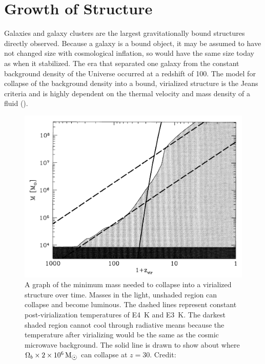 \documentclass{paper}
\begin{document}
\section*{Growth of Structure}
  Galaxies and galaxy clusters are the largest gravitationally bound 
  structures directly observed. Because a galaxy is a bound object, it may be 
  assumed to have not changed size with cosmological inflation, so would have 
  the same size today as when it stabilized.  The era that separated one 
  galaxy from the constant background density of the Universe occurred at a 
  redshift of 100.  The model for collapse of the background density into a 
  bound, virialized structure is the Jeans criteria and is highly dependent on 
  the thermal velocity and mass density of a fluid (\cite{Jeans1902}).

  \begin{figure}[H]
    \begin{centering}
    \includegraphics[scale=0.4]{Struct-mass.pdf}
    \caption{A graph of the minimum mass needed to collapse into a virialized
      structure over time. Masses in the light, unshaded region can collapse 
      and become luminous.  The dashed lines represent constant 
      post-virialization temperatures of \SI{E4}{K} and \SI{E3}{K}.  The 
      darkest shaded region cannot cool through radiative means because the 
      temperature after virializing would be the same as the cosmic microwave 
      background. The solid line is drawn to show about where 
      \(\Omega_b \times \SI{2E6}{M_{\astrosun}}\) can collapse at \(z=30\).
      Credit: \cite{1997ApJ...474....1T}}
    \label{fig:Struct-mass}
    \end{centering}
  \end{figure}
\end{document}

